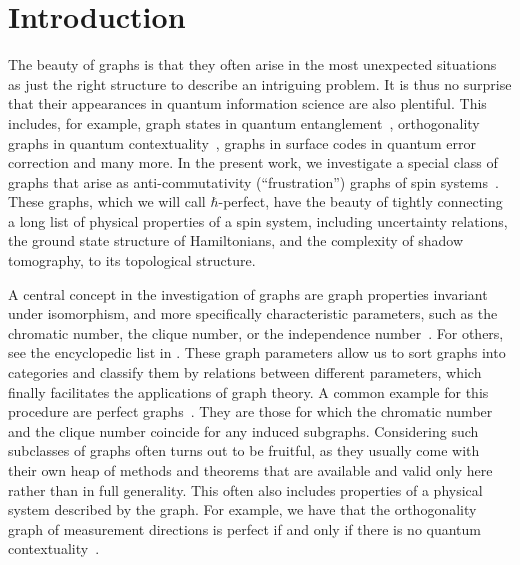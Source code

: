 \documentclass[
12pt,
prx,
aps,
reprint,
a4paper,
longbibliograph,
nofootinbib,
nobibnotes,
superscriptaddress
]{revtex4-2}
\theoremstyle{definition}
\begin{document}
\date{14 November 2025}

\maketitle







\section{Introduction}
The beauty of graphs is that they often arise in the most unexpected situations as just the right structure to describe an intriguing problem. It is thus no surprise that their appearances in quantum information science are also plentiful. This includes, for example, graph states in quantum entanglement~\cite{hein2006entanglement,audenaert2005entanglement}, orthogonality graphs in quantum contextuality~\cite{cabello2014graph}, graphs in surface codes in quantum error correction \cite{Sarkar2024} and many more. 
In the present work, we investigate a special class of graphs that arise as anti-commutativity (``frustration'') graphs of spin systems~\cite{sachdev1993gapless,chapman2023unified}. These graphs, which we will call $\hbar$-perfect, have the beauty of tightly connecting a long list of physical properties of a spin system, including uncertainty relations, the ground state structure of Hamiltonians, and the complexity of shadow tomography, to its topological structure.  

A central concept in the investigation of graphs are graph properties invariant under isomorphism, and more specifically characteristic parameters, such as the chromatic number, the clique number, or the independence number~\cite{Diestel2025GraphT}. 
For others, see the encyclopedic list in \cite{ISGCI}. 
{These graph parameters allow us to sort graphs into categories and classify them by relations between different parameters, which finally facilitates the applications of graph theory.}
A common example for this procedure are perfect graphs~\cite{berge1961farbung}. 
They are those for which the chromatic number and the clique number coincide for any induced subgraphs. Considering such subclasses of graphs often turns out to be fruitful, as they usually come with their own heap of methods and theorems that are available and valid only here rather than in full generality.
This often also includes properties of a physical system described by the graph.
For example, we have that the orthogonality graph of measurement directions is perfect if and only if  there is no quantum contextuality~\cite{cabello2014graph}.
\end{document}
